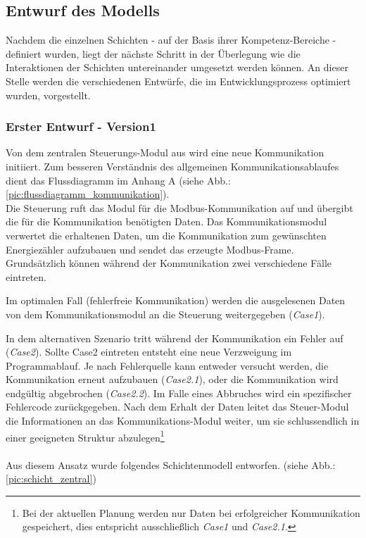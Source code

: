\documentclass[Bachelorarbeit.tex]{subfiles}
\begin{document}
\subsection{Entwurf des Modells }
Nachdem die einzelnen Schichten - auf der Basis ihrer Kompetenz-Bereiche - definiert wurden, liegt der nächste Schritt in der Überlegung wie die Interaktionen der Schichten untereinander umgesetzt werden können. 
An dieser Stelle werden die verschiedenen Entwürfe, die im Entwicklungsprozess optimiert wurden, vorgestellt. 

\subsubsection*{Erster Entwurf - Version1}
Von dem zentralen Steuerungs-Modul aus wird eine neue Kommunikation initiiert. Zum besseren Verständnis des allgemeinen Kommunikationsablaufes dient das Flussdiagramm im Anhang A (siehe Abb.: \ref{pic:flussdiagramm_kommunikation}). \\
Die Steuerung ruft das Modul für die Modbus-Kommunikation auf und übergibt die für die 
Kommunikation benötigten Daten.  Das Kommunikationsmodul 
verwertet die erhaltenen Daten, um die Kommunikation zum gewünschten 
Energiezähler aufzubauen und sendet das erzeugte Modbus-Frame. \\
Grundsätzlich können während der Kommunikation zwei verschiedene Fälle eintreten. 
\begin{comment}
Der optimale Fall wäre es wenn die Kommunikation ohne Fehler abläuft.
Dabei wurden die ausgelesenen Daten von dem Kommunikationsmodul an die Steuerung weitergegeben (\textit{Case1}). 
\end{comment} 
Im optimalen Fall (fehlerfreie Kommunikation) werden die ausgelesenen Daten von dem Kommunikationsmodul an die Steuerung weitergegeben (\textit{Case1}). 
\begin{comment}
Das alternative Szenario wäre es, das bei der Kommunikation ein Fehler aufgetreten ist (\textit{Case2}). Sollte Case2 eingetreten entstehen zwei weitere Ablaufverhalten.
\end{comment}
In dem alternativen Szenario tritt während der Kommunikation ein Fehler auf (\textit{Case2}). 
Sollte Case2 eintreten entsteht eine neue Verzweigung im Programmablauf.
Je nach Fehlerquelle kann entweder versucht werden, die Kommunikation erneut aufzubauen (\textit{Case2.1}), oder die Kommunikation wird endgültig abgebrochen (\textit{Case2.2}).
Im Falle eines Abbruches wird ein spezifischer Fehlercode zurückgegeben. 
Nach dem Erhalt der Daten leitet das Steuer-Modul die Informationen an das Kommunikations-Modul weiter, um sie schlussendlich in einer geeigneten Struktur abzulegen\footnote{Bei der aktuellen Planung werden nur Daten bei erfolgreicher Kommunikation gespeichert, dies entspricht ausschließlich \textit{Case1} und \textit{Case2.1}.}\\\\
Aus diesem Ansatz wurde folgendes Schichtenmodell entworfen. (siehe Abb.: \ref{pic:schicht_zentral})\newpage
\end{document}
